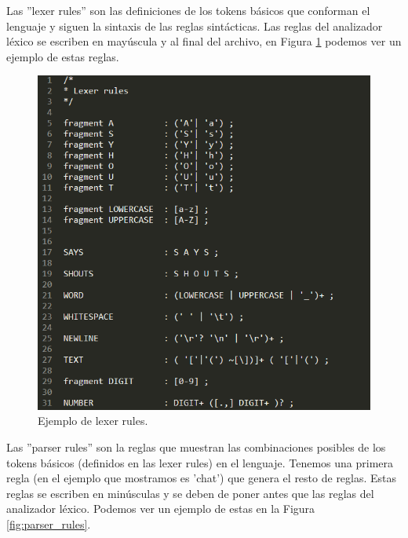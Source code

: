 \bigskip

Las ''lexer rules'' son las definiciones de los tokens básicos que conforman el lenguaje y siguen la sintaxis de las reglas sintácticas. Las reglas del analizador léxico se escriben en mayúscula y al final del archivo, en Figura \ref{fig:lexer_rules} podemos ver un ejemplo de estas reglas.

\begin{figure}[] %
\centering
\includegraphics[scale=0.55]{imagenes/lexer_rules.png}  %
\caption{Ejemplo de lexer rules.} \label{fig:lexer_rules}
\end{figure}

\bigskip

Las ''parser rules'' son la reglas que muestran las combinaciones posibles de los tokens básicos (definidos en las lexer rules) en el lenguaje.
\newline
Tenemos una primera regla (en el ejemplo que mostramos es 'chat') que genera el resto de reglas.
Estas reglas se escriben en minúsculas y se deben de poner antes que las reglas del analizador léxico.
\newline
Podemos ver un ejemplo de estas en la Figura \ref{fig:parser_rules}.


